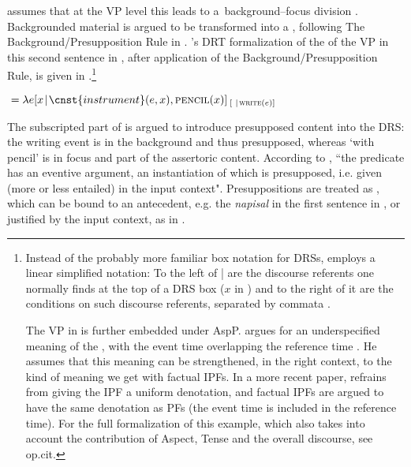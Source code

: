 \documentclass[output=paper,modfonts,newtxmath,hidelinks]{langscibook}
\begin{document}
\sloppy \noindent \citeauthor{gronndiss} assumes that at the VP level this  leads to a~background--focus division \citep[in the sense of][]{krifka01}. Backgrounded material is argued to be transformed into a , following The Background/Presupposition Rule in \citet{geurtssandt97}. \citeauthor{gronndiss}'s DRT formalization of the  of the VP in this second sentence in , after application of the Background/Presupposition Rule, is given in  \citep[][193]{gronndiss}.\footnote{Instead of the probably more familiar box notation for DRSs, \citeauthor{gronndiss} employs a linear simplified notation: To the left of | are the discourse referents one normally finds at the top of a DRS box ($x$ in ) and to the right of it are the conditions on such discourse referents, separated by commata \citep[for further discussion see][43]{gronndiss}. 

The VP in  is further embedded under AspP. \citet{gronndiss} argues for an underspecified meaning of the , with the event time overlapping the reference time  \citep[building on][]{klein95}. He assumes that this meaning can be strengthened, in the right context, to the kind of  meaning we get with factual IPFs. In a more recent paper, \citet{gronn15} refrains from giving the  IPF a uniform denotation, and factual IPFs are argued to have the same denotation as PFs (the event time is included in the reference time). For the full formalization of this example, which also takes into account the contribution of Aspect, Tense and the overall discourse, see op.cit.} 

\ea\label{gronnanalysis}
${}=\lambda e[x\hspace{0.1em} |\hspace{0.1em} \cnst{instrument}(e, x), \textsc{pencil}(x)]_{\hspace{2pt}[ \hspace{0.3em} |\hspace{0.1em}\textsc{write}(e)]}$
\z
	
\noindent The subscripted part of  is argued to introduce presupposed content into the DRS: the writing event is in the background and thus presupposed, whereas `with pencil' is in focus and part of the assertoric content. According to \citet[][192]{gronndiss}, ``the  predicate has an eventive argument, an instantiation of which is presupposed, i.e. given (more or less entailed) in the input context". Presuppositions are treated as , which can be bound to an antecedent, e.g. the  \textit{napisal} in the first sentence in , or justified by the input context, as in .
\end{document}
